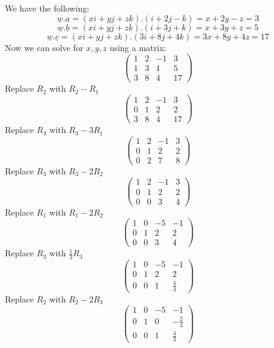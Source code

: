 \documentclass{article}
\begin{document}
\begin{homeworkProblem}
    We have the following:
    $$ \underline{w}.\underline{a} = (xi + yj + zk).(i + 2j - k) = x + 2y - z = 3 $$
    $$ \underline{w}.\underline{b} = (xi + yj + zk).(i + 3j + k) = x + 3y + z = 5 $$
    $$ \underline{w}.\underline{c} = (xi + yj + zk).(3i + 8j + 4k) = 3x + 8y + 4z = 17 $$Now we can solve for $x, y, z$ using a matrix:
    $$\begin{pmatrix}
            1 & 2 & -1 & 3  \\
            1 & 3 & 1  & 5  \\
            3 & 8 & 4  & 17
        \end{pmatrix}$$
    Replace $R_2$ with $R_2 - R_1$
    $$\begin{pmatrix}
            1 & 2 & -1 & 3  \\
            0 & 1 & 2  & 2  \\
            3 & 8 & 4  & 17
        \end{pmatrix}$$
    Replace $R_3$ with $R_3 - 3R_1$
    $$\begin{pmatrix}
            1 & 2 & -1 & 3 \\
            0 & 1 & 2  & 2 \\
            0 & 2 & 7  & 8
        \end{pmatrix}$$
    Replace $R_3$ with $R_3 - 2R_2$
    $$\begin{pmatrix}
            1 & 2 & -1 & 3 \\
            0 & 1 & 2  & 2 \\
            0 & 0 & 3  & 4
        \end{pmatrix}$$
    Replace $R_1$ with $R_1 - 2R_2$
    $$\begin{pmatrix}
            1 & 0 & -5 & -1 \\
            0 & 1 & 2  & 2  \\
            0 & 0 & 3  & 4
        \end{pmatrix}$$
    Replace $R_3$ with $\frac{1}{3}R_3$
    $$\begin{pmatrix}
            1 & 0 & -5 & -1          \\
            0 & 1 & 2  & 2           \\
            0 & 0 & 1  & \frac{4}{3}
        \end{pmatrix}$$
    Replace $R_2$ with $R_2 - 2R_3$
    $$\begin{pmatrix}
            1 & 0 & -5 & -1           \\
            0 & 1 & 0  & -\frac{2}{3} \\
            0 & 0 & 1  & \frac{4}{3}

\end{pmatrix}$$
\end{homeworkProblem}
\end{document}
